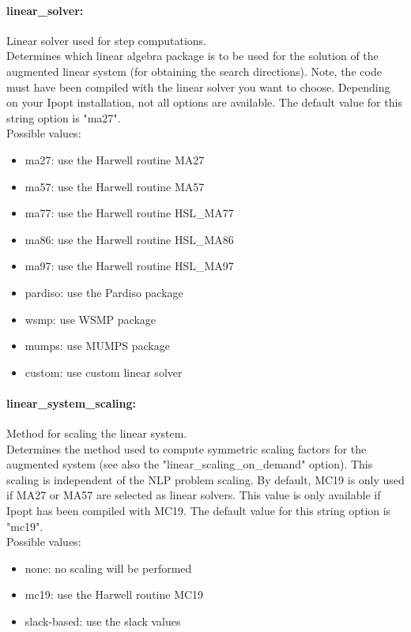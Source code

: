\paragraph{linear\_solver:}\label{opt:linear_solver} Linear solver used for step computations. \\
 Determines which linear algebra package is to be used for the solution of the augmented linear system (for obtaining the search directions). Note, the code must have been compiled with the linear solver you want to choose. Depending on your Ipopt installation, not all options are available. The default value for this string option is "ma27".
\\ 
Possible values:
\begin{itemize}
   \item ma27: use the Harwell routine MA27
   \item ma57: use the Harwell routine MA57
   \item ma77: use the Harwell routine HSL\_MA77
   \item ma86: use the Harwell routine HSL\_MA86
   \item ma97: use the Harwell routine HSL\_MA97
   \item pardiso: use the Pardiso package
   \item wsmp: use WSMP package
   \item mumps: use MUMPS package
   \item custom: use custom linear solver
\end{itemize}

\paragraph{linear\_system\_scaling:}\label{opt:linear_system_scaling} Method for scaling the linear system. \\
 Determines the method used to compute symmetric scaling factors for the augmented system (see also the "linear\_scaling\_on\_demand" option).  This scaling is independent of the NLP problem scaling.  By default, MC19 is only used if MA27 or MA57 are selected as linear solvers. This value is only available if Ipopt has been compiled with MC19. The default value for this string option is "mc19".
\\ 
Possible values:
\begin{itemize}
   \item none: no scaling will be performed
   \item mc19: use the Harwell routine MC19
   \item slack-based: use the slack values
\end{itemize}

